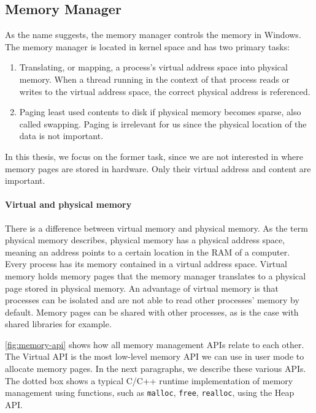 \documentclass[a4paper, 11pt, english]{report}
\begin{document}
\subsection{Memory Manager}
As the name suggests, the memory manager controls the memory in Windows. The memory manager is located in kernel space and has two primary tasks:
\begin{enumerate}
	\item Translating, or mapping, a process's virtual address space into physical memory. When a thread running in the context of that process reads or writes to the virtual address space, the correct physical address is referenced.
	\item Paging least used contents to disk if physical memory becomes sparse, also called swapping. Paging is irrelevant for us since the physical location of the data is not important.
\end{enumerate}

In this thesis, we focus on the former task, since we are not interested in where memory pages are stored in hardware. Only their virtual address and content are important.

\paragraph{Virtual and physical memory}
There is a difference between virtual memory and physical memory. As the term physical memory describes, physical memory has a physical address space, meaning an address points to a certain location in the RAM of a computer. Every process has its memory contained in a virtual address space. Virtual memory holds memory pages that the memory manager translates to a physical page stored in physical memory. An advantage of virtual memory is that processes can be isolated and are not able to read other processes' memory by default. Memory pages can be shared with other processes, as is the case with shared libraries for example.

\autoref{fig:memory-api} shows how all memory management APIs relate to each other. The Virtual API is the most low-level memory API we can use in user mode to allocate memory pages. In the next paragraphs, we describe these various APIs. The dotted box shows a typical C/C++ runtime implementation of memory management using functions, such as \texttt{malloc}, \texttt{free}, \texttt{realloc}, using the Heap API.
\end{document}

